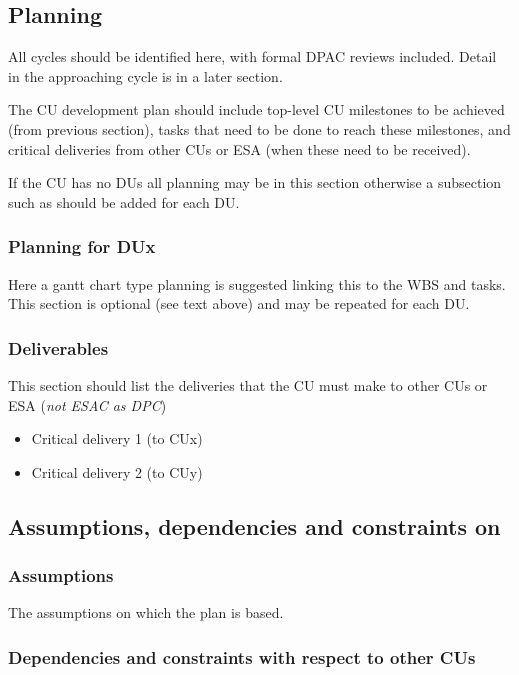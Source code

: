 \documentclass[DM,lsstdraft,SDP]{lsstdoc}
\begin{document}
\subsection{Planning }
All cycles should be identified here, with formal DPAC reviews included.
Detail in the approaching cycle is in a later section.

The CU development plan should include top-level CU milestones to be achieved (from previous section), tasks that need to be done to reach these milestones, and critical deliveries from other CUs or ESA (when these need to be received).

If the CU has no DUs all planning may be in this section otherwise a
subsection such as  should be added for each DU.

\subsubsection{ Planning for DUx \label{sect:du1plan}}
Here a gantt chart type planning is suggested linking this to the WBS and tasks.
This section is optional (see text above) and may be repeated for each DU.

\subsubsection{Deliverables\label{sect:deliverables}}
This section should list the deliveries that the CU must make to other CUs or ESA (\textit{not ESAC as DPC})

\begin{itemize}
    \item Critical delivery 1 (to CUx)
    \item Critical delivery 2 (to CUy)
\end{itemize}

\subsection{Assumptions, dependencies and constraints on \CU  \label{sect:assumptionsdep}}

\subsubsection{Assumptions  \label{sect:assumtions}}
The assumptions on which the plan is based.

\subsubsection{ Dependencies and constraints with respect to other CUs
\label{sect:cuconstraints}}
\end{document}
